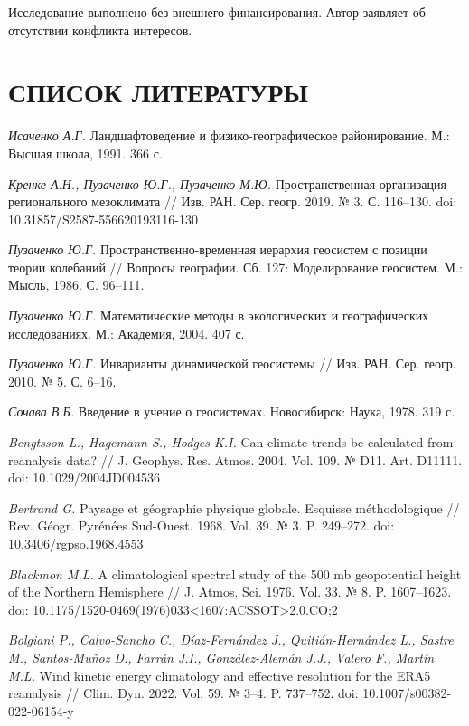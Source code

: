 \documentclass[12pt,a4paper]{article}
\begin{document}
Исследование выполнено без внешнего финансирования. Автор заявляет об отсутствии конфликта интересов.

\clearpage
\section{СПИСОК ЛИТЕРАТУРЫ}

\noindent \textit{Исаченко А.Г.} Ландшафтоведение и физико-географическое районирование. М.: Высшая школа, 1991. 366 с.

\noindent \textit{Кренке А.Н., Пузаченко Ю.Г., Пузаченко М.Ю.} Пространственная организация регионального мезоклимата // Изв. РАН. Сер. геогр. 2019. № 3. С. 116–130. doi: 10.31857/S2587-556620193116-130

\noindent \textit{Пузаченко Ю.Г.} Пространственно-временная иерархия геосистем с позиции теории колебаний // Вопросы географии. Сб. 127: Моделирование геосистем. М.: Мысль, 1986. С. 96–111.

\noindent \textit{Пузаченко Ю.Г.} Математические методы в экологических и географических исследованиях. М.: Академия, 2004. 407 с.

\noindent \textit{Пузаченко Ю.Г.} Инварианты динамической геосистемы // Изв. РАН. Сер. геогр. 2010. № 5. С. 6–16.

\noindent \textit{Сочава В.Б.} Введение в учение о геосистемах. Новосибирск: Наука, 1978. 319 с.

\noindent \textit{Bengtsson L., Hagemann S., Hodges K.I.} Can climate trends be calculated from reanalysis data? // J. Geophys. Res. Atmos. 2004. Vol. 109. № D11. Art. D11111. doi: 10.1029/2004JD004536

\noindent \textit{Bertrand G.} Paysage et géographie physique globale. Esquisse méthodologique // Rev. Géogr. Pyrénées Sud-Ouest. 1968. Vol. 39. № 3. P. 249–272. doi: 10.3406/rgpso.1968.4553

\noindent \textit{Blackmon M.L.} A climatological spectral study of the 500 mb geopotential height of the Northern Hemisphere // J. Atmos. Sci. 1976. Vol. 33. № 8. P. 1607–1623. doi: 10.1175/1520-0469(1976)033<1607:ACSSOT>2.0.CO;2

\noindent \textit{Bolgiani P., Calvo-Sancho C., Díaz-Fernández J., Quitián-Hernández L., Sastre M., Santos-Muñoz D., Farrán J.I., González-Alemán J.J., Valero F., Martín M.L.} Wind kinetic energy climatology and effective resolution for the ERA5 reanalysis // Clim. Dyn. 2022. Vol. 59. № 3–4. P. 737–752. doi: 10.1007/s00382-022-06154-y
\end{document}
